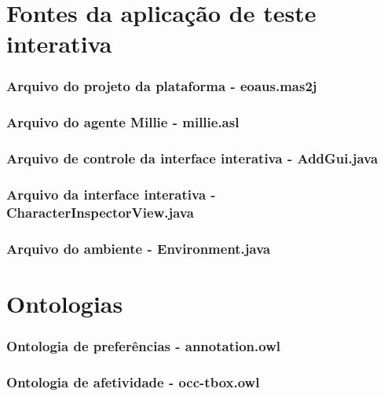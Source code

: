 \chapter{Fontes da aplicação de teste interativa}
\subsection*{Arquivo do projeto da plataforma - eoaus.mas2j}


\subsection*{Arquivo do agente Millie - millie.asl}


\subsection*{Arquivo de controle da interface interativa - AddGui.java}


\subsection*{Arquivo da interface interativa - CharacterInspectorView.java}


\subsection*{Arquivo do ambiente - Environment.java}


\chapter{Ontologias}

\subsection*{Ontologia de preferências - annotation.owl}


\subsection*{Ontologia de afetividade - occ-tbox.owl}


